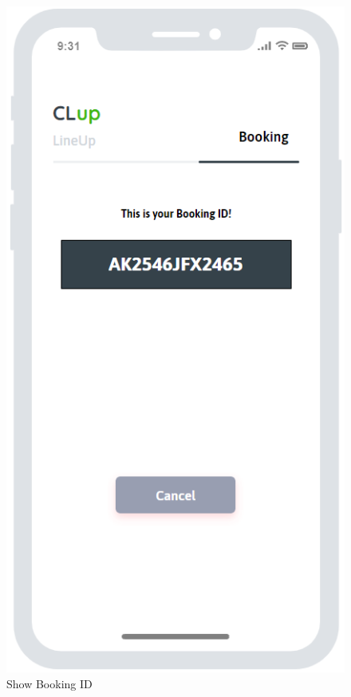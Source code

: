 \begin{figure}[H]
\begin{minipage}{0.3\linewidth} 
\includegraphics[width=\textwidth]{./Images/MockupLogo/mockBookingID}
\caption{Show Booking ID}
\end{minipage} 
\end{figure}
